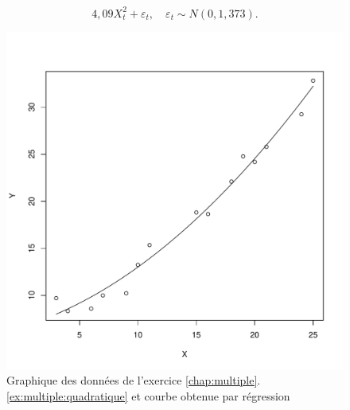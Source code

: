 \begin{solution}{3.16}
\begin{displaymath}
      4,09 X_t^2 + \varepsilon_t, \quad
      \varepsilon_t \sim N(0, 1,373).
    \end{displaymath}
    \begin{figure}
      \centering
\begin{knitrout}
\color{fgcolor}\begin{kframe}
\begin{alltt}
 \hlopt{~}   
 \hlkwb{<-} \hlstd{(}\hlopt{$} \hlopt{$}  \hlstd{=} \hlstd{)}
  \hlstd{(}   \hlstd{=} \hlstd{))}
\end{alltt}
\end{kframe}
\includegraphics[width=\maxwidth]{figure/unnamed-chunk-54-1}

\end{knitrout}
      \caption{Graphique des données de l'exercice
        \ref{chap:multiple}.\ref{ex:multiple:quadratique} et courbe
        obtenue par régression}
      \label{fig:multiple:quadratique2}
    \end{figure}
  
\end{solution}
